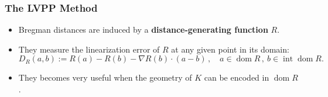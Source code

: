 \documentclass[aspectratio=169,xcolor=dvipsnames,11pt]{beamer}
\begin{document}
\begin{frame}
\end{frame}

\begin{frame}\frametitle{The LVPP Method}
\begin{itemize}
\item Bregman distances are induced by a \textbf{distance-generating function} $R$.
\item They measure the linearization error of $R$ at any given point in its domain:
\begin{equation*}
D_R(a, b) := R(a) - R(b) - \nabla R(b) \cdot (a-b)\,, \quad a \in \text{$\mathop{\text{dom}} R$}\,,~b \in \text{$\mathop{\text{int}} \mathop{\text{dom}} R$}.
\end{equation*}
\item They becomes very \alert{useful} when the \alert{geometry} of $K$ can be \alert{encoded in $\mathop{\text{dom}} R$}.
\end{itemize}
\end{frame}
\end{document}

